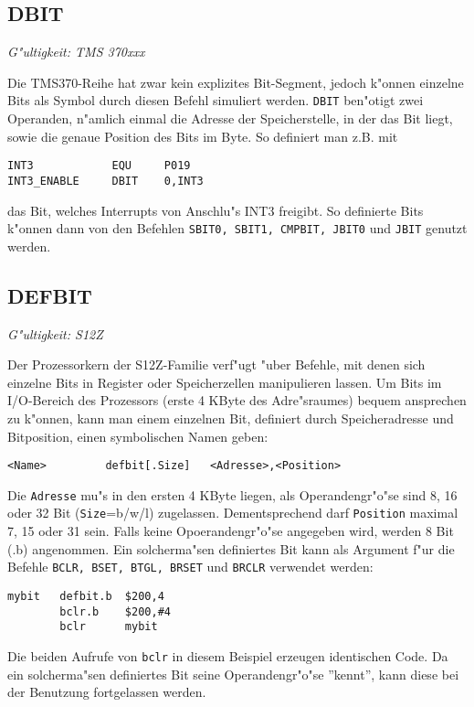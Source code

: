 \documentclass[12pt,a4paper,twoside]{report}
\makeatletter
\newcommand{\tty}[1]{{\tt #1}}
\newcommand{\ttindex}[1]{\index{#1@{\tt #1}}}
\makeatother
\begin{document}

\subsection{DBIT}
\ttindex{DBIT}

{\em G"ultigkeit: TMS 370xxx}

Die TMS370-Reihe hat zwar kein explizites Bit-Segment, jedoch k"onnen
einzelne Bits als Symbol durch diesen Befehl simuliert werden.  \tty{DBIT}
ben"otigt zwei Operanden, n"amlich einmal die Adresse der Speicherstelle,
in der das Bit liegt, sowie die genaue Position des Bits im Byte.
So definiert man z.B. mit
\begin{verbatim}
INT3            EQU     P019
INT3_ENABLE     DBIT    0,INT3
\end{verbatim}
das Bit, welches Interrupts von Anschlu"s INT3 freigibt.  So definierte
Bits k"onnen dann von den Befehlen \tty{SBIT0, SBIT1, CMPBIT, JBIT0}
und \tty{JBIT} genutzt werden.


\subsection{DEFBIT}
\ttindex{DEFBIT}

{\em G"ultigkeit: S12Z}

Der Prozessorkern der S12Z-Familie verf"ugt "uber Befehle, mit denen
sich einzelne Bits in Register oder Speicherzellen manipulieren
lassen.  Um Bits im I/O-Bereich des Prozessors (erste 4 KByte des
Adre"sraumes) bequem ansprechen zu k"onnen, kann man einem einzelnen
Bit, definiert durch Speicheradresse und Bitposition, einen
symbolischen Namen geben:
\begin{verbatim}
<Name>         defbit[.Size]   <Adresse>,<Position>
\end{verbatim}
Die \tty{Adresse} mu"s in den ersten 4 KByte liegen, als Operandengr"o"se
sind 8, 16 oder 32 Bit (\tty{Size}=b/w/l) zugelassen.
Dementsprechend darf \tty{Position} maximal 7, 15 oder 31 sein. 
Falls keine Opoerandengr"o"se angegeben wird, werden 8 Bit (.b)
angenommen.  Ein solcherma"sen definiertes Bit kann als Argument f"ur
die Befehle {\tt BCLR, BSET, BTGL, BRSET} und {\tt BRCLR} verwendet
werden:
\begin{verbatim}
mybit   defbit.b  $200,4
        bclr.b    $200,#4
        bclr      mybit
\end{verbatim}
Die beiden Aufrufe von {\tt bclr} in diesem Beispiel erzeugen
identischen Code.  Da ein solcherma"sen definiertes Bit seine
Operandengr"o"se ''kennt'', kann diese bei der Benutzung fortgelassen
werden.
\end{document}
